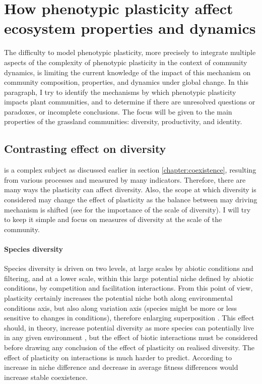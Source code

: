 \section{How phenotypic plasticity affect ecosystem properties and dynamics}

The difficulty to model phenotypic plasticity, more precisely to integrate multiple aspects of the complexity of phenotypic plasticity in the context of community dynamics, is limiting the current knowledge of the impact of this mechanism on community composition, properties, and dynamics under global change. In this paragraph, I try to identify the mechanisms by which phenotypic plasticity impacts plant communities, and to determine if there are unresolved questions or paradoxes, or incomplete conclusions. The focus will be given to the main properties of the grassland communities: diversity, productivity, and identity.



\subsection{Contrasting effect on diversity}

 is a complex subject as discussed earlier in section \ref{chapter:coexistence}, resulting from various processes and measured by many indicators. Therefore, there are many ways the plasticity can affect diversity. Also, the scope at which diversity is considered may change the effect of plasticity as the balance between may driving mechanism is shifted (see \citet{chalmandrier_communities_2015} for the importance of the scale of diversity). I will try to keep it simple and focus on measures of diversity at the scale of the community.
\paragraph{Species diversity}

Species diversity is driven on two levels, at large scales by abiotic conditions and filtering, and at a lower scale, within this large potential niche defined by abiotic conditions, by competition and facilitation interactions. From this point of view, plasticity certainly increases the potential niche both along environmental conditions axis, but also along variation axis (species might be more or less sensitive to changes in conditions), therefore enlarging  superposition \parencite{violle_return_2012}. This effect should, in theory, increase potential diversity as more species can potentially live in any given environment \parencite{lepik_high_2005, jung_intraspecific_2014}, but the effect of biotic interactions must be considered before drawing any conclusion of the effect of plasticity on realised diversity. The effect of plasticity on interactions is much harder to predict. According to \citet{adler_niche_2007} increase in niche difference and decrease in average fitness differences would increase stable coexistence.

